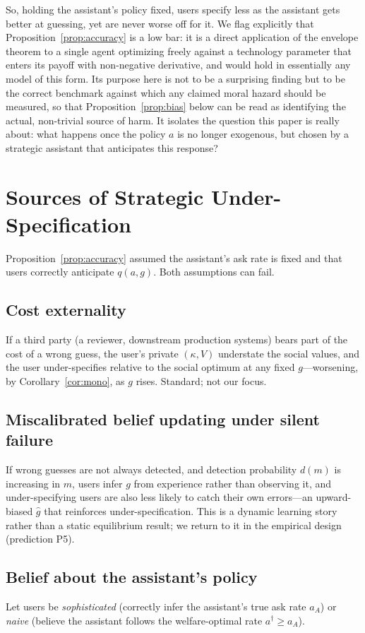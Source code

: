 \documentclass[11pt]{article}
\begin{document}
So, holding the assistant's policy fixed, users specify less as the assistant gets
better at guessing, yet are never worse off for it. We flag explicitly that
Proposition~\ref{prop:accuracy} is a low bar: it is a direct application of the
envelope theorem to a single agent optimizing freely against a technology
parameter that enters its payoff with non-negative derivative, and would hold in
essentially any model of this form. Its purpose here is not to be a surprising
finding but to be the correct benchmark against which any claimed moral hazard
should be measured, so that Proposition~\ref{prop:bias} below can be read as
identifying the actual, non-trivial source of harm. It isolates the
question this paper is really about: what happens once the policy $a$ is no longer
exogenous, but chosen by a strategic assistant that anticipates this response?

\section{Sources of Strategic Under-Specification}

Proposition~\ref{prop:accuracy} assumed the assistant's ask rate is fixed and that
users correctly anticipate $q(a,g)$. Both assumptions can fail.

\subsection{Cost externality}
If a third party (a reviewer, downstream production systems) bears part of the
cost of a wrong guess, the user's private $(\kappa, V)$ understate the social
values, and the user under-specifies relative to the social optimum at any fixed
$g$---worsening, by Corollary~\ref{cor:mono}, as $g$ rises. Standard; not our focus.

\subsection{Miscalibrated belief updating under silent failure}
If wrong guesses are not always detected, and detection probability $d(m)$ is
increasing in $m$, users infer $g$ from experience rather than observing it, and
under-specifying users are also less likely to catch their own errors---an
upward-biased $\hat g$ that reinforces under-specification. This is a dynamic
learning story rather than a static equilibrium result; we return to it in the
empirical design (prediction P5).

\subsection{Belief about the assistant's policy}
\label{sec:naive-soph}
Let users be \emph{sophisticated} (correctly infer the assistant's true ask rate
$a_A$) or \emph{naive} (believe the assistant follows the welfare-optimal rate
$a^\dagger \ge a_A$).
\end{document}
